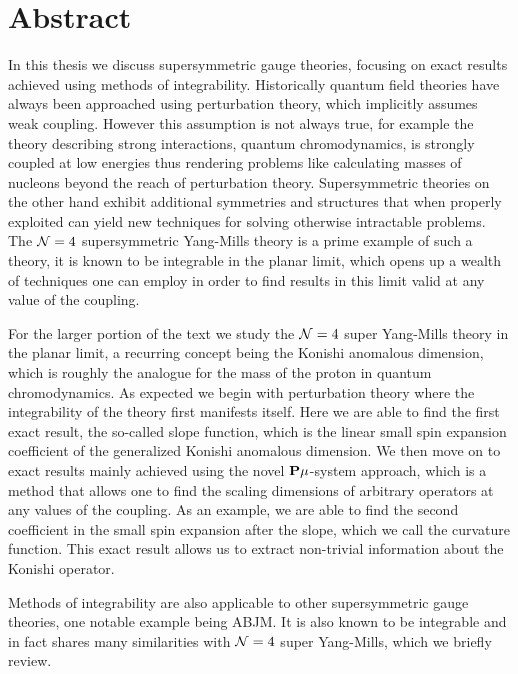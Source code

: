 
\section*{Abstract}

\vspace{30pt}

In this thesis we discuss supersymmetric gauge theories, focusing on exact results achieved using methods of integrability. 
Historically quantum field theories have always been approached using perturbation theory, which implicitly assumes weak coupling.
However this assumption is not always true, for example the theory describing strong interactions, quantum chromodynamics, is strongly coupled at low energies thus rendering problems like calculating masses of nucleons beyond the reach of perturbation theory.
Supersymmetric theories on the other hand exhibit additional symmetries and structures that when properly exploited can yield new techniques for solving otherwise intractable problems.
The $\mathcal{N}=4$ supersymmetric Yang-Mills theory is a prime example of such a theory, it is known to be integrable in the planar limit, which opens up a wealth of techniques one can employ in order to find results in this limit valid at any value of the coupling. 

For the larger portion of the text we study the $\mathcal{N}=4$ super Yang-Mills theory in the planar limit, a recurring concept being the Konishi anomalous dimension, which is roughly the analogue for the mass of the proton in quantum chromodynamics.
As expected we begin with perturbation theory where the integrability of the theory first manifests itself.
Here we are able to find the first exact result, the so-called slope function, which is the linear small spin expansion coefficient of the generalized Konishi anomalous dimension.
We then move on to exact results mainly achieved using the novel ${\bf P}\mu$-system approach, which is a method that allows one to find the scaling dimensions of arbitrary operators at any values of the coupling.
As an example, we are able to find the second coefficient in the small spin expansion after the slope, which we call the curvature function.
This exact result allows us to extract non-trivial information about the Konishi operator.

Methods of integrability are also applicable to other supersymmetric gauge theories, one notable example being ABJM.
It is also known to be integrable and in fact shares many similarities with $\mathcal{N}=4$ super Yang-Mills, which we briefly review.
